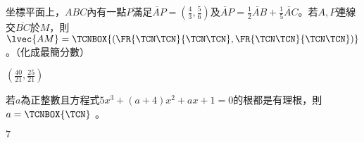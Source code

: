\begin{QUESTION}
    \begin{QBODY}
         坐標平面上，$ABC$內有一點$P$滿足$\lvec{AP}=(\frac{4}{3},\frac{5}{6})$及$\lvec{AP}=\frac{1}{2}\lvec{AB}+\frac{1}{5}\lvec{AC}$。若$A,P$連線交$\overline{BC}$於$M$，則$\lvec{AM}= \TCNBOX{\left(\FR{\TCN\TCN}{\TCN\TCN} ,\FR{\TCN\TCN}{\TCN\TCN} \right)}$。（化成最簡分數）
    \end{QBODY}
    \begin{QFROMS}
    \end{QFROMS}
    \begin{QTAGS}
    \end{QTAGS}
    \begin{QANS}
        $(\frac{40}{21},\frac{25}{21})$
    \end{QANS}
    \begin{QSOL}
    \end{QSOL}
    \begin{QEMPTYSPACE}
    \end{QEMPTYSPACE}
\end{QUESTION}
\begin{QUESTION}
    \begin{QBODY}
        若$a$為正整數且方程式$5{{x}^{3}}+(a+4){{x}^{2}}+ax+1=0$的根都是有理根，則$a= \TCNBOX{\TCN}$     。
    \end{QBODY}
    \begin{QFROMS}
    \end{QFROMS}
    \begin{QTAGS}
    \end{QTAGS}
    \begin{QANS}
        $7$
    \end{QANS}
    \begin{QSOL}
    \end{QSOL}
    \begin{QEMPTYSPACE}
    \end{QEMPTYSPACE}
\end{QUESTION}
